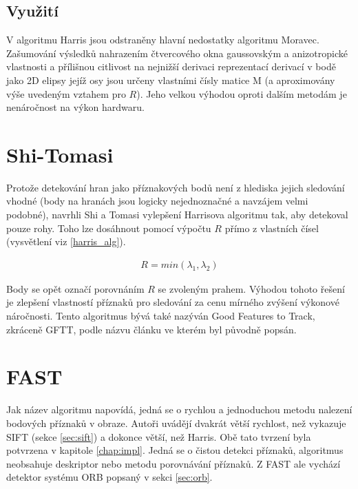 \subsection{Využití}
V algoritmu Harris jsou odstraněny hlavní nedostatky algoritmu Moravec. Zašumování výsledků nahrazením čtvercového okna gaussovským a anizotropické vlastnosti a přílišnou citlivost na nejnižší derivaci reprezentací derivací v bodě jako 2D elipsy jejíž osy jsou určeny vlastními čísly matice M (a aproximovány výše uvedeným vztahem pro $R$). Jeho velkou výhodou oproti dalším metodám je nenáročnost na výkon hardwaru.

\section{Shi-Tomasi}

	Protože detekování hran jako příznakových bodů není z hlediska jejich sledování vhodné (body na hranách jsou logicky nejednoznačné a navzájem velmi podobné), navrhli Shi a Tomasi \cite{shi1994good} vylepšení Harrisova algoritmu tak, aby detekoval pouze rohy. Toho lze dosáhnout pomocí výpočtu $R$ přímo z vlastních čísel (vysvětlení viz \ref{harris_alg}). 
	
	\begin{align}
	R = min(\lambda_1, \lambda_2)
	\end{align}
	
	Body se opět označí porovnáním $R$ se zvoleným prahem. Výhodou tohoto řešení je zlepšení vlastností příznaků pro sledování za cenu mírného zvýšení výkonové náročnosti. Tento algoritmus bývá také nazýván Good Features to Track, zkráceně GFTT, podle názvu článku ve kterém byl původně popsán.

\section{FAST}

	Jak název algoritmu napovídá, jedná se o rychlou a jednoduchou metodu nalezení bodových příznaků v obraze. Autoři uvádějí dvakrát větší rychlost, než vykazuje SIFT (sekce \ref{sec:sift}) a dokonce větší, než Harris. Obě tato tvrzení byla potvrzena v kapitole \ref{chap:impl}. Jedná se o čistou detekci příznaků, algoritmus neobsahuje deskriptor nebo metodu porovnávání příznaků. Z FAST \cite{rosten2010faster} ale vychází detektor systému ORB popsaný v sekci \ref{sec:orb}.
	
